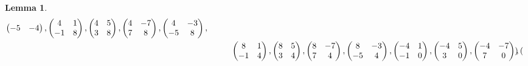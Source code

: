 \documentclass[12pt]{article}
\theoremstyle{definition}
\newtheorem{lemma}[theorem]{Lemma}
\numberwithin{equation}{section}
\numberwithin{theorem}{section}
\begin{document}
\begin{lemma}
{\begin{align}
\begin{pmatrix}
-5 & -4
\end{pmatrix},  
\begin{pmatrix}
4 & 1 \\
-1 & 8
\end{pmatrix}, 
\begin{pmatrix}
4 & 5 \\
3 & 8
\end{pmatrix}, 
\begin{pmatrix}
4 & -7 \\
7 & 8
\end{pmatrix}, 
\begin{pmatrix}
4 & -3 \\
-5 & 8
\end{pmatrix},  \notag \\  
&\hspace{10mm}
\begin{pmatrix}
8 & 1 \\
-1 & 4
\end{pmatrix}, 
\begin{pmatrix}
8 & 5 \\
3 & 4
\end{pmatrix}, 
\begin{pmatrix}
8 & -7 \\
7 & 4
\end{pmatrix}, 
\begin{pmatrix}
8 & -3 \\
-5 & 4
\end{pmatrix}, 
\begin{pmatrix}
-4 & 1 \\
-1 & 0
\end{pmatrix}, 
\begin{pmatrix}
-4 & 5 \\
3 & 0
\end{pmatrix}, 
\begin{pmatrix}
-4 & -7 \\
7 & 0
\end{pmatrix}, 
\begin{pmatrix}

\end{pmatrix}
\end{align}}
\end{lemma}
\end{document}
